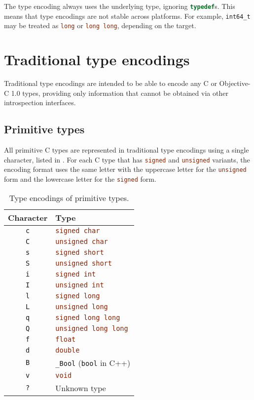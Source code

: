 \documentclass[a4paper]{report}
\newcommand{\ccode}[1]{\lstinline[language={C}]{#1}}
\begin{document}
The type encoding always uses the underlying type, ignoring \ccode{typedef}s.
This means that type encodings are not stable across platforms.
For example, \ccode{int64_t} may be treated as \ccode{long} or \ccode{long long}, depending on the target.

\section{Traditional type encodings}

Traditional type encodings are intended to be able to encode any C or Objective-C 1.0 types, providing only information that cannot be obtained via other introspection interfaces.

\subsection{Primitive types}

All primitive C types are represented in traditional type encodings using a single character, listed in .
For each C type that has \ccode{signed} and \ccode{unsigned} variants, the encoding format uses the same letter with the uppercase letter for the \ccode{unsigned} form and the lowercase letter for the \ccode{signed} form.

\begin{table}
	\begin{center}
		\begin{tabular}{c|l}
			Character & Type\\\hline
			\texttt{c} & \ccode{signed char} \\
			\texttt{C} & \ccode{unsigned char} \\
			\texttt{s} & \ccode{signed short} \\
			\texttt{S} & \ccode{unsigned short} \\
			\texttt{i} & \ccode{signed int} \\
			\texttt{I} & \ccode{unsigned int} \\
			\texttt{l} & \ccode{signed long} \\
			\texttt{L} & \ccode{unsigned long} \\
			\texttt{q} & \ccode{signed long long} \\
			\texttt{Q} & \ccode{unsigned long long} \\
			\texttt{f} & \ccode{float} \\
			\texttt{d} & \ccode{double} \\
			\texttt{B} & \ccode{_Bool} (\ccode{bool} in C++)\\
			\texttt{v} & \ccode{void}\\
			\texttt{?} & Unknown type
		\end{tabular}
		\caption{\label{tab:primencode}Type encodings of primitive types.}
	\end{center}
\end{table}
\end{document}
